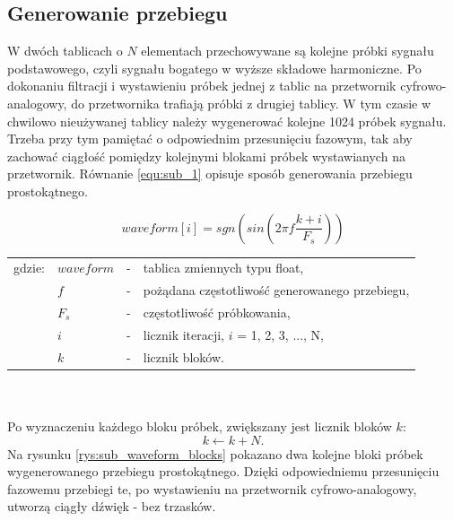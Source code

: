 \subsection{Generowanie przebiegu}
W dwóch tablicach o $N$ elementach przechowywane są kolejne próbki sygnału podstawowego, czyli sygnału bogatego w wyższe składowe harmoniczne. Po dokonaniu filtracji i wystawieniu próbek jednej z tablic na przetwornik cyfrowo-analogowy, do przetwornika trafiają próbki z drugiej tablicy. W tym czasie w chwilowo nieużywanej tablicy należy wygenerować kolejne 1024 próbek sygnału. Trzeba przy tym pamiętać o odpowiednim przesunięciu fazowym, tak aby zachować ciągłość pomiędzy kolejnymi blokami próbek wystawianych na przetwornik. Równanie \ref{equ:sub_1} opisuje sposób generowania przebiegu prostokątnego.

\begin{equation} \label{equ:sub_1}
waveform[i]=sgn(sin(2\pi f\frac{k+i}{F_s}))
\end{equation}
\begin{tabular}{ l l l l}
	gdzie: & $waveform$ &  - & tablica zmiennych typu float, \\
	&	$f$ & - &  pożądana częstotliwość generowanego przebiegu, \\
	&	$F_s$ & - & częstotliwość próbkowania,\\
	&	$i$ & - &  licznik iteracji, $i$ = 1, 2, 3, ..., N,\\
	&	$k$ & - &  licznik bloków.\\
\end{tabular} \\ \\
Po wyznaczeniu każdego bloku próbek, zwiększany jest licznik bloków $k$:
\begin{equation} \label{equ:sub_2}
k \gets k + N.
\end{equation}
Na rysunku \ref{rys:sub_waveform_blocks} pokazano dwa kolejne bloki próbek wygenerowanego przebiegu prostokątnego. Dzięki odpowiedniemu przesunięciu fazowemu przebiegi te, po wystawieniu na przetwornik cyfrowo-analogowy, utworzą ciągły dźwięk - bez trzasków.
